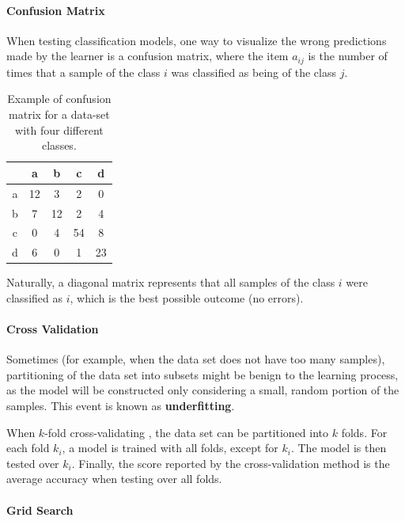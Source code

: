 \documentclass[12pt]{article}
\begin{document}
\paragraph{Confusion Matrix}

When testing classification models, one way to visualize the wrong predictions made by the learner is a confusion matrix, where the item $a_{ij}$ is the number of times that a sample of the class $i$ was classified as being of the class $j$.

\begin{table}[H]
	\centering
	\begin{tabular}{ |c || *{4}{c|} }
		\hline
           &   a &   b &   c &   d \\\hline\hline
		a & 12 &   3 &   2 &   0 \\
		b &   7 & 12 &   2 &   4 \\
		c &   0 &   4 & 54 &   8 \\
		d &   6 &   0 &   1 & 23 \\\hline
	\end{tabular}

	\caption{Example of confusion matrix for a data-set with four different classes.}
\end{table}

Naturally, a diagonal matrix represents that all samples of the class $i$ were classified as $i$, which is the best possible outcome (no errors).

\paragraph{Cross Validation}

Sometimes (for example, when the data set does not have too many samples), partitioning of the data set into subsets might be benign to the learning process, as the model will be constructed only considering a small, random portion of the samples. This event is known as \textbf{underfitting}.

When $k$-fold cross-validating \cite{crossvalid}, the data set can be partitioned into $k$ folds. For each fold $k_i$, a model is trained with all folds, except for $k_i$. The model is then tested over $k_i$. Finally, the score reported by the cross-validation method is the average accuracy when testing over all folds.

\paragraph{Grid Search}
\end{document}
